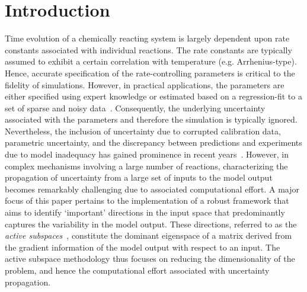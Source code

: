\section{Introduction}
\label{sec:intro}



Time evolution of a chemically reacting system is largely dependent upon rate
constants associated with individual reactions. The rate constants are
typically assumed to exhibit a certain correlation with temperature (e.g.
Arrhenius-type). Hence, accurate specification of the rate-controlling
parameters is critical to the fidelity of simulations. However, in practical
applications, the parameters are either specified using expert knowledge or
estimated based on a regression-fit to a set of sparse and noisy
data~\cite{Burnham:1987, Burnham:1988, Vohra:2011, Sarathy:2012}.
Consequently, the underlying uncertainty associated with the parameters and
therefore the simulation is typically ignored. Nevertheless, the inclusion of
uncertainty due to corrupted calibration data, parametric uncertainty,
and the discrepancy between predictions and experiments
due to model inadequacy has gained prominence in recent
years~\cite{Vohra:2014, Vohra:2017, Morrison:2018, Hantouche:2018}. 
However, in complex mechanisms involving a large number of reactions,
characterizing the propagation of uncertainty from a large set of inputs to
the model output becomes remarkably challenging due to associated
computational effort. 
A major focus of this paper pertains to the implementation of a robust
framework that aims to identify `important' directions in the input space
that predominantly captures the variability in the model output. These
directions, referred to as the \textit{active subspaces}~\cite{Constantine:2015},
constitute the dominant
eigenspace of a matrix derived from the gradient information of the model
output with respect to an input. The active subspace methodology thus
focuses on reducing the dimensionality of the problem, and hence the 
computational effort associated with uncertainty propagation. 

